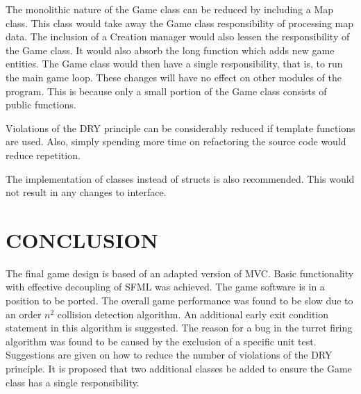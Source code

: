 \documentclass[10pt,twocolumn]{witseiepaper}
\begin{document}
The monolithic nature of the Game class can be reduced by including a Map class. This class would take away the Game class responsibility of processing map data.  The inclusion of a Creation manager would also lessen the responsibility of the Game class. It would also absorb the long function which adds new game entities.  The Game class would then have a single responsibility, that is, to run the main game loop. These changes will have no effect on other modules of the program. This is because only a small portion of the Game class consists of public functions.

Violations of the DRY principle can be considerably reduced if template functions are used. Also, simply spending more time on refactoring the source code would reduce repetition. 

The implementation of classes instead of structs is also recommended. This would not result in any changes to interface.

%
\section{CONCLUSION} 
The final game design is based of an adapted version of MVC. Basic functionality with effective decoupling of SFML was achieved. The game software is in a position to be ported. The overall game performance was found to be slow due to an order $ n^{2} $ collision detection algorithm. An additional early exit condition statement in this algorithm is suggested. The reason for a bug in the turret firing algorithm was found to be caused by the exclusion of a specific unit test. Suggestions are given on how to reduce the number of violations of the DRY principle. It is proposed that two additional classes be added to ensure the Game class has a single responsibility.

\balance

%


\end{document}
